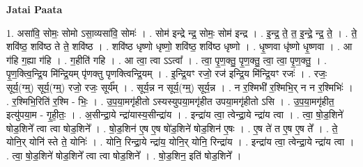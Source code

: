 \documentclass[17pt]{extarticle}
\begin{document}
\textbf{Jatai Paata} \newline

1. असा॑वि॒ सोमः॒ सोमो ऽसा॒व्यसा॑वि॒ सोमः॑ । . सोम॑ इन्द्रे न्द्र॒ सोमः॒ सोम॑ इन्द्र । . इ॒न्द्र॒ ते॒ त॒ इ॒न्द्रे॒ न्द्र॒ ते॒ । . ते॒ शवि॑ष्ठ॒ शवि॑ष्ठ ते ते॒ शवि॑ष्ठ । . शवि॑ष्ठ धृष्णो धृष्णो॒ शवि॑ष्ठ॒ शवि॑ष्ठ धृष्णो । . धृ॒ष्णवा धृ॑ष्णो धृ॒ष्णवा । . आ ग॑हि ग॒ह्या ग॑हि । . ग॒हीति॑ गहि । . आ त्वा॒ त्वा ऽऽत्वा᳚ । . त्वा॒ पृ॒ण॒क्तु॒ पृ॒ण॒क्तु॒ त्वा॒ त्वा॒ पृ॒ण॒क्तु॒ । . पृ॒ण॒क्त्वि॒न्द्रि॒य मि॑न्द्रि॒यम् पृ॑णक्तु पृणक्त्विन्द्रि॒यम् । . इ॒न्द्रि॒यꣳ रजो॒ रज॑ इन्द्रि॒य मि॑न्द्रि॒यꣳ रजः॑ । . रजः॒ सूर्य॒(ग्म्॒) सूर्य॒(ग्म्॒) रजो॒ रजः॒ सूर्य᳚म् । . सूर्य॒न्न न सूर्य॒(ग्म्॒) सूर्य॒न्न । . न र॒श्मिभी॑ र॒श्मिभि॒र् न न र॒श्मिभिः॑ । . र॒श्मिभि॒रिति॑ र॒श्मि - भिः॒ । . उ॒प॒या॒मगृ॑हीतो ऽस्यस्युपया॒मगृ॑हीत उपया॒मगृ॑हीतो ऽसि । . उ॒प॒या॒मगृ॑हीत॒ इत्यु॑पया॒म - गृ॒ही॒तः॒ । . अ॒सीन्द्रा॒ये न्द्रा॑यास्य॒सीन्द्रा॑य । . इन्द्रा॑य त्वा॒ त्वेन्द्रा॒ये न्द्रा॑य त्वा । . त्वा॒ षो॒ड॒शिने॑ षोड॒शिने᳚ त्वा त्वा षोड॒शिने᳚ । . षो॒ड॒शिन॑ ए॒ष ए॒ष षो॑ड॒शिने॑ षोड॒शिन॑ ए॒षः । . ए॒ष ते॑ त ए॒ष ए॒ष ते᳚ । . ते॒ योनि॒र् योनि॑ स्ते ते॒ योनिः॑ । . योनि॒ रिन्द्रा॒ये न्द्रा॑य॒ योनि॒र् योनि॒ रिन्द्रा॑य । . इन्द्रा॑य त्वा॒ त्वेन्द्रा॒ये न्द्रा॑य त्वा । . त्वा॒ षो॒ड॒शिने॑ षोड॒शिने᳚ त्वा त्वा षोड॒शिने᳚ । . षो॒ड॒शिन॒ इति॑ षोड॒शिने᳚ । \newline
\end{document}

